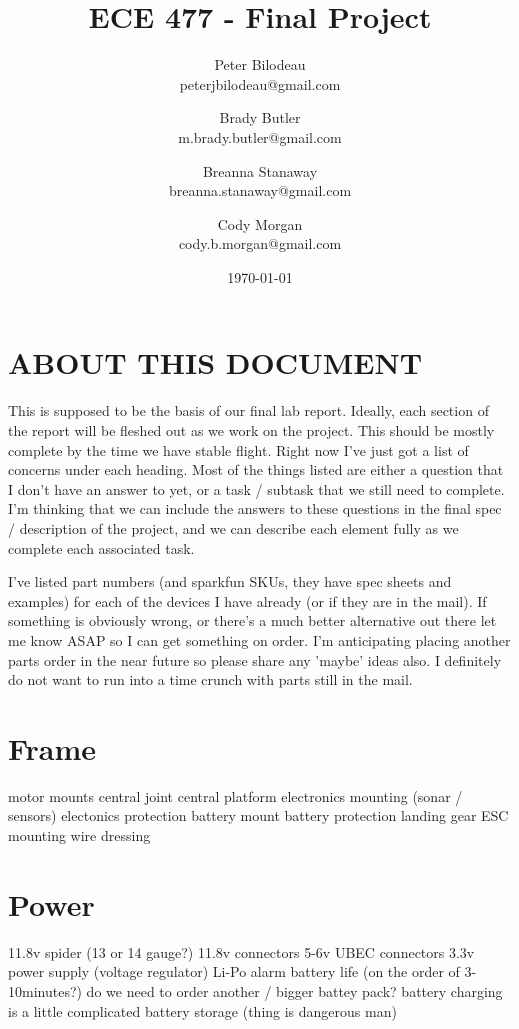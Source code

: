 \documentclass{article}
\begin{document}
\title{ECE 477 - Final Project}
\author{Peter Bilodeau\\
	peterjbilodeau@gmail.com\and
	Brady Butler\\
	m.brady.butler@gmail.com \and
	Breanna Stanaway\\
	breanna.stanaway@gmail.com\and
	Cody Morgan\\
	cody.b.morgan@gmail.com}
\date{\today}
\maketitle{}
\section{ABOUT THIS DOCUMENT}
This is supposed to be the basis of our final lab report.  Ideally, each section of the report will be fleshed out as we work on the project.  This should be mostly complete by the time we have stable flight.  Right now I've just got a list of concerns under each heading.  Most of the things listed are either a question that I don't have an answer to yet, or a task / subtask that we still need to complete.  I'm thinking that we can include the answers to these questions in the final spec / description of the project, and we can describe each element fully as we complete each associated task.

I've listed part numbers (and sparkfun SKUs, they have spec sheets and examples) for each of the devices I have already (or if they are in the mail).  If something is obviously wrong, or there's a much better alternative out there let me know ASAP so I can get something on order.  I'm anticipating placing another parts order in the near future so please share any 'maybe' ideas also.  I definitely do not want to run into a time crunch with parts still in the mail.

\section{Frame}
motor mounts
central joint
central platform
electronics mounting (sonar / sensors)
electonics protection
battery mount
battery protection
landing gear
ESC mounting
wire dressing

\section{Power}
11.8v spider (13 or 14 gauge?)
11.8v connectors
5-6v UBEC connectors
3.3v power supply (voltage regulator)
Li-Po alarm
battery life (on the order of 3-10minutes?)
do we need to order another / bigger battey pack?
battery charging is a little complicated
battery storage (thing is dangerous man)
\end{document}
